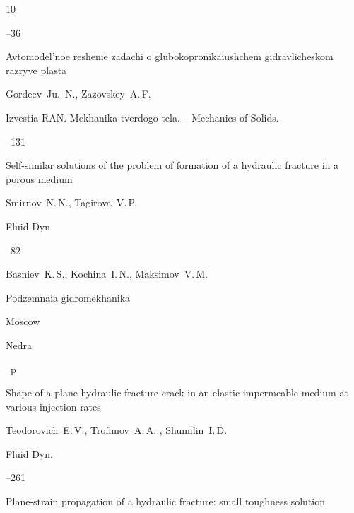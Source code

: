 \begin{thebibliography}{10}


--36




\paper Avtomodel'noe reshenie zadachi o glubokopronikaiushchem gidravlicheskom razryve plasta 

\by   	Gordeev~Ju.\, N., Zazovskey~A.\,F.

\jour Izvestia RAN. Mekhanika tverdogo tela. – Mechanics of Solids.



--131








\paper Self-similar solutions of the problem of formation of a hydraulic fracture in a porous medium 

\by   Smirnov~N.\,N., Tagirova~V.\,P.

\jour Fluid Dyn



--82






\by Basniev~K.\,S., Kochina~I.\,N., Maksimov~V.\,M. 

\book Podzemnaia gidromekhanika

\publaddr Moscow

\publ Nedra


~p




\paper Shape of a plane hydraulic fracture crack in an elastic impermeable medium at various injection rates 

\by   	Teodorovich~E.\,V., Trofimov~A.\,A. , Shumilin~I.\,D.  

\jour Fluid Dyn. 



--261




\paper Plane-strain propagation of a hydraulic fracture: small toughness solution


\end{thebibliography}
